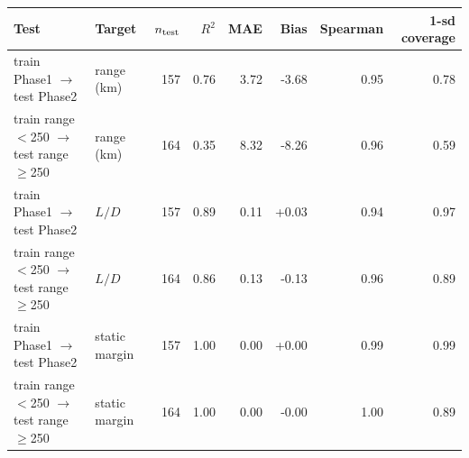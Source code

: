 \begin{tabular}{@{}llrrrrrr@{}}
\toprule
Test & Target & $n_{\rm test}$ & $R^2$ & MAE & Bias & Spearman & 1-sd coverage \\
\midrule
train Phase1 $\to$ test Phase2 & range (km) & 157 & 0.76 & 3.72 & -3.68 & 0.95 & 0.78 \\
train range$<$250 $\to$ test range$\geq$250 & range (km) & 164 & 0.35 & 8.32 & -8.26 & 0.96 & 0.59 \\
train Phase1 $\to$ test Phase2 & $L/D$ & 157 & 0.89 & 0.11 & +0.03 & 0.94 & 0.97 \\
train range$<$250 $\to$ test range$\geq$250 & $L/D$ & 164 & 0.86 & 0.13 & -0.13 & 0.96 & 0.89 \\
train Phase1 $\to$ test Phase2 & static margin & 157 & 1.00 & 0.00 & +0.00 & 0.99 & 0.99 \\
train range$<$250 $\to$ test range$\geq$250 & static margin & 164 & 1.00 & 0.00 & -0.00 & 1.00 & 0.89 \\
\bottomrule
\end{tabular}
